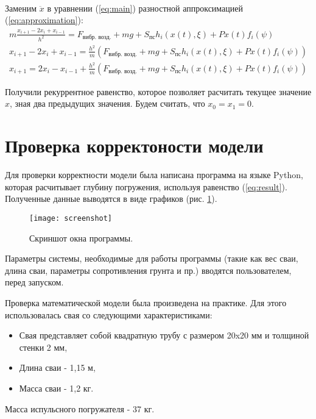 ~\

\noindent Заменим $\ddot{x}$ в уравнении (\ref{eq:main}) разностной аппроксимацией (\ref{eq:approximation}):
\begin{equation}
    \label{eq:result}
    \begin{aligned}
        m\frac{x_{i+1} - 2x_i + x_{i-1}}{h^2} = F_\text{вибр. возд.} + mg + S_\text{пс} h_i(x(t), \xi)+ P x(t) f_i(\psi)\\
        x_{i+1} - 2x_i + x_{i-1} = \frac{h^2}{m}(F_\text{вибр. возд.} + mg + S_\text{пс} h_i(x(t), \xi) + P x(t) f_i(\psi))\\
        x_{i+1} = 2x_i - x_{i-1} + \frac{h^2}{m}(F_\text{вибр. возд.} + mg + S_\text{пс} h_i(x(t), \xi) + P x(t) f_i(\psi))
    \end{aligned}
\end{equation}

\noindent Получили рекуррентное равенство, которое позволяет расчитать текущее значение $x$, зная два предыдущих значения. Будем
считать, что $x_0 = x_1 = 0$.

\clearpage

\section{Проверка корректоности модели}

Для проверки корректности модели была написана программа на языке Python, которая расчитывает глубину
погружения, используя равенство (\ref{eq:result}). Полученные данные выводятся в виде графиков
(рис. \ref{fig:screenshot}).

\begin{figure}[ht]
    \centering
    \texttt{[image: screenshot]}
    \caption{Скриншот окна программы.}
    \label{fig:screenshot}
\end{figure}

\noindent Параметры системы, необходимые для работы программы (такие как вес сваи, длина сваи, параметры сопротивления грунта
и пр.) вводятся пользователем, перед запуском.

Проверка математической модели была произведена на практике. Для этого использовалась свая со следующими характеристиками:
\begin{itemize}
    \item Свая представляет собой квадратную трубу с размером 20x20 мм и толщиной стенки 2 мм,
    \item Длина сваи - 1,15 м,
    \item Масса сваи - 1,2 кг.
\end{itemize}
Масса испульсного погружателя - 37 кг.

